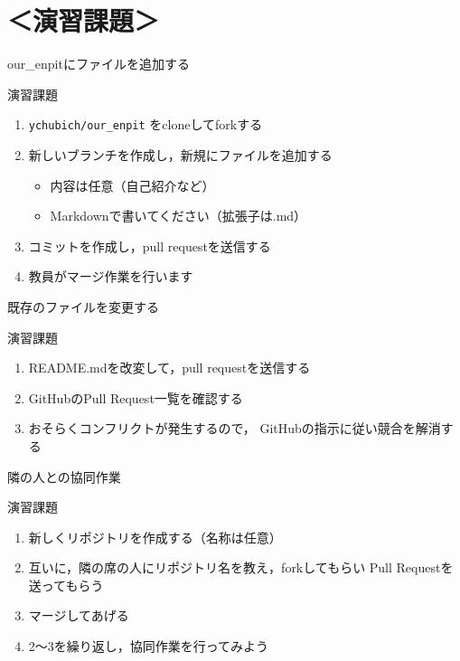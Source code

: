 \documentclass[t, aspectratio=169]{beamer}
\begin{document}
\section{＜演習課題＞}
\label{sec-4-4}
\begin{frame}[fragile,label=sec-4-4-1]{our\_enpitにファイルを追加する}
 \begin{block}{演習課題}
\begin{enumerate}
\item \texttt{ychubich/our\_enpit} をcloneしてforkする
\item 新しいブランチを作成し，新規にファイルを追加する
\begin{itemize}
\item 内容は任意（自己紹介など）
\item Markdownで書いてください（拡張子は.md）
\end{itemize}
\item コミットを作成し，pull requestを送信する
\item 教員がマージ作業を行います
\end{enumerate}
\end{block}
\end{frame}

\begin{frame}[label=sec-4-4-2]{既存のファイルを変更する}
\begin{block}{演習課題}
\begin{enumerate}
\item README.mdを改変して，pull requestを送信する
\item GitHubのPull Request一覧を確認する
\item おそらくコンフリクトが発生するので，
GitHubの指示に従い競合を解消する
\end{enumerate}
\end{block}
\end{frame}

\begin{frame}[label=sec-4-4-3]{隣の人との協同作業}
\begin{block}{演習課題}
\begin{enumerate}
\item 新しくリポジトリを作成する（名称は任意）
\item 互いに，隣の席の人にリポジトリ名を教え，forkしてもらい
Pull Requestを送ってもらう
\item マージしてあげる
\item 2〜3を繰り返し，協同作業を行ってみよう
\end{enumerate}
\end{block}
\end{frame}
\end{document}
